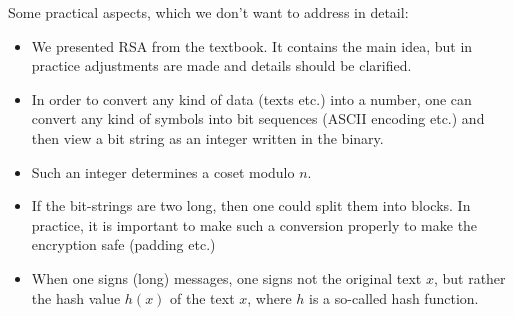 \documentclass{beamer}
\begin{document}
\begin{frame}
	Some practical aspects, which we don't want to address in detail: 
	\begin{itemize}[<+->] 
		\item We presented RSA from the textbook. It contains the main idea, but in practice adjustments are made and details should be clarified. 
		\item In order to convert any kind of data (texts etc.) into a number, one can convert any kind of symbols into bit sequences (ASCII encoding etc.) and then view a bit string as an integer written in the binary. 
		\item Such an integer determines a coset modulo $n$. 
		\item If the bit-strings are two long, then one could split them into blocks. In practice, it is important to make such a conversion properly to make the encryption safe (padding etc.) 
		\item When one signs (long) messages, one signs not the original text $x$, but rather the hash value $h(x)$ of the text $x$, where $h$ is a so-called hash function. 
	\end{itemize} 
\end{frame} 
\end{document}
